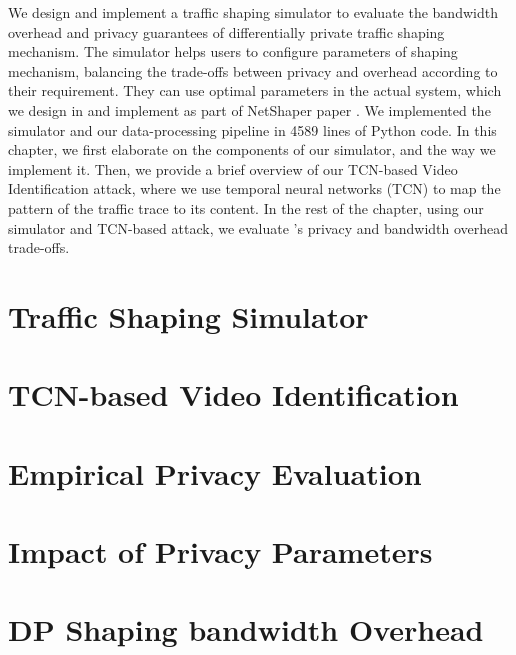 We design and implement a traffic shaping simulator to evaluate the bandwidth overhead and privacy guarantees of {\sys} differentially private traffic shaping mechanism.
The simulator helps users to configure parameters of {\sys} shaping mechanism, balancing the trade-offs between privacy and overhead according to their requirement.
They can use optimal parameters in the actual {\sys} system, which we design in  and implement as part of NetShaper paper {\addref}.
We implemented the simulator and our data-processing pipeline in 4589 lines of Python code.
In this chapter, we first elaborate on the components of our simulator, and the way we implement it. 
Then, we provide a brief overview of our TCN-based Video Identification attack, where we use temporal neural networks (TCN) to map the pattern of the traffic trace to its content. 
In the rest of the chapter, using our simulator and TCN-based attack, we evaluate {\sys}'s privacy and bandwidth overhead trade-offs.

\section{Traffic Shaping Simulator}\label{sec:eval-simulator}


\section{TCN-based Video Identification}\label{sec:eval-tcn}


\section{Empirical Privacy Evaluation}\label{sec:eval-empirical-privacy}


\section{Impact of Privacy Parameters}\label{sec:eval-privacy-params}


\section{DP Shaping bandwidth Overhead}\label{sec:eval-bw}
